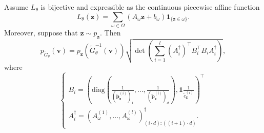 \begin{theorem}\label{thm:dgn_sequence_density}
    Assume $L_{\theta}$ is bijective and expressible as the continuous piecewise affine function $$L_{\theta}(\mathbf{z})=\sum_{\omega\in\Omega}\left(A_{\omega}\mathbf{z}+b_{\omega}\right)\mathbf{1}_{\{\mathbf{z}\in\omega\}}.$$Moreover, suppose that $\mathbf{z}\sim p_{\mathbf{z}}$. Then $$p_{\tilde{G}_{\theta}}(\mathbf{v})=p_{\mathbf{z}}\left(\tilde{G}^{-1}_{\theta}(\mathbf{v})\right)\sqrt{\det\left(\sum_{i=1}^l\left(A_i^{\dagger}\right)^\top B_i^\top B_iA_i^{\dagger}\right)},$$where $$\begin{cases}B_i=\left(\mathrm{diag}\left(\frac{1}{\left(\tilde{\mathbf{p}}^{(i)}_{\mathbf{z}}\right)_1},\dots,\frac{1}{\left(\tilde{\mathbf{p}}^{(i)}_{\mathbf{z}}\right)_d}\right),\mathbf{1}\frac{1}{\tilde{c}_{\mathbf{z}}^{(i)}}\right)^\top\\A_i^{\dagger}=\left(A_{\omega}^{(1)},\dots,A_{\omega}^{(l)}\right)^{\dagger}_{(i\cdot d):((i+1)\cdot d)}.\end{cases}$$
\end{theorem}

